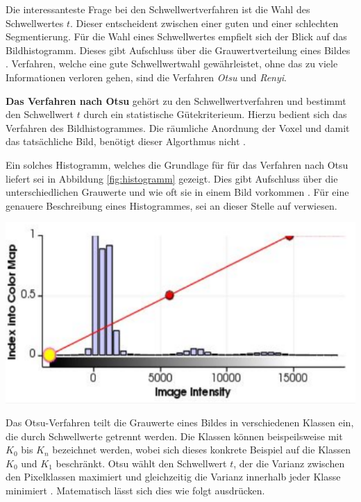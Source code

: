 Die interessanteste Frage bei den Schwellwertverfahren ist die Wahl des Schwellwertes
$t$. Dieser entscheident zwischen einer guten und einer schlechten Segmentierung.
Für die Wahl eines Schwellwertes empfielt sich der Blick auf das Bildhistogramm.
Dieses gibt Aufschluss über die Grauwertverteilung eines Bildes \citep[vgl.][Seite361]{lehmann2013bildverarbeitung}.
Verfahren, welche eine gute Schwellwertwahl gewährleistet, ohne das zu viele Informationen
verloren gehen, sind die Verfahren \textit{Otsu} und \textit{Renyi}.

\pagebreak

\textbf{Das Verfahren nach Otsu} gehört zu den Schwellwertverfahren und bestimmt
den Schwellwert $t$ durch ein statistische Gütekriterieum. Hierzu bedient sich das
Verfahren des Bildhistogrammes. Die räumliche Anordnung der Voxel und damit das
tatsächliche Bild, benötigt dieser Algorthmus nicht \citep[vgl.][Seite 264]{lehmann2013bildverarbeitung}.

\begin{minipage}{0.40\textwidth}
	Ein solches Histogramm, welches die Grundlage für für das Verfahren nach Otsu
	liefert sei in Abbildung \ref{fig:histogramm} gezeigt. Dies gibt Aufschluss über
	die unterschiedlichen Grauwerte und wie oft sie in einem Bild vorkommen \citep[vgl.][Seite264]{lehmann2013bildverarbeitung}.
	Für eine genauere Beschreibung eines Histogrammes, sei an dieser Stelle auf \citet[Seite42]{burger2009}
	verwiesen.
\end{minipage}
\hfill
\begin{minipage}{0.50\textwidth}
	\centering
	\includegraphics[width=1\textwidth]{img/histogramm.jpg}
	 \label{fig:histogramm}
\end{minipage}

Das Otsu-Verfahren teilt die Grauwerte eines Bildes in verschiedenen Klassen ein,
die durch Schwellwerte getrennt werden. Die Klassen können beispeilsweise mit
$K_{0}$ bis $K_{n}$ bezeichnet werden, wobei sich dieses konkrete Beispiel auf die
Klassen $K_{0}$ und $K_{1}$ beschränkt. Otsu wählt den Schwellwert $t$, der die Varianz
zwischen den Pixelklassen maximiert und gleichzeitig die Varianz innerhalb jeder
Klasse minimiert \citep[vgl.][Seite264]{lehmann2013bildverarbeitung}.
Matematisch lässt sich dies wie folgt ausdrücken.

